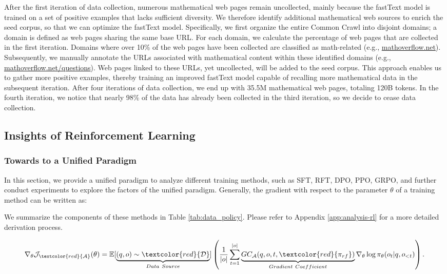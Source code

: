 \begin{itemize}[topsep=0pt]
After the first iteration of data collection, numerous mathematical web pages remain uncollected, mainly because the fastText model is trained on a set of positive examples that lacks sufficient diversity. We therefore identify additional mathematical web sources to enrich the seed corpus, so that we can optimize the fastText model. Specifically, we first organize the entire Common Crawl into disjoint domains; a domain is defined as web pages sharing the same base URL. For each domain, we calculate the percentage of web pages that are collected in the first iteration. Domains where over 10\% of the web pages have been collected are classified as math-related (e.g., \url{mathoverflow.net}).
Subsequently, we manually annotate the URLs associated with mathematical content within these identified domains (e.g., \url{mathoverflow.net/questions}).
Web pages linked to these URLs, yet uncollected, will be added to the seed corpus. This approach enables us to gather more positive examples, thereby training an improved fastText model capable of recalling more mathematical data in the subsequent iteration. After four iterations of data collection, we end up with 35.5M mathematical web pages, totaling 120B tokens. In the fourth iteration, we notice that nearly 98\% of the data has already been collected in the third iteration, so we decide to cease data collection.

\subsection{Insights of Reinforcement Learning}
\subsubsection{Towards to a Unified Paradigm} In this section, we provide a unified paradigm to analyze different training methods, such as SFT, RFT, DPO, PPO, GRPO, and further conduct experiments to explore the factors of the unified paradigm. Generally, the gradient with respect to the parameter $\theta$ of a training method can be written as:

We summarize the components of these methods in Table \ref{tab:data_policy}.
Please refer to Appendix \ref{app:analysis-rl} for a more detailed derivation process.

\begin{equation}
    \nabla_{\theta}\mathcal{J}_{\textcolor{red}{\mathcal{A}}}(\theta) = \mathbb{E}[\underbrace{(q,o) \sim \textcolor{red}{\mathcal{D}}}_{Data \ Source}]\left( \frac{1}{|o|} \sum_{t=1}^{|o|}  \underbrace{GC_{{\mathcal{A}}}(q, o, t, \textcolor{red}{\pi_{{rf}}})}_{Gradient \ Coefficient}  \nabla_{\theta}\log \pi_{\theta}(o_t | q, o_{<t})\right).
\label{eq:objective}
\end{equation}


\end{itemize}
